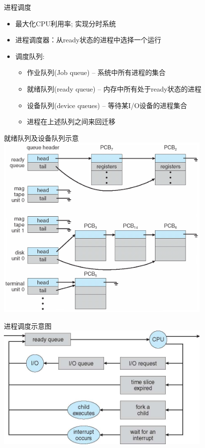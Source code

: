 \documentclass[xcolor=svgnames]{beamer}
\begin{document}
\begin{CJK*}{UTF8}{gbsn}
\begin{frame}{进程调度}
\begin{itemize}
\item 最大化CPU利用率; 实现分时系统
\item 进程调度器：从ready状态的进程中选择一个运行
\item 调度队列:
\begin{itemize}
\item 作业队列(Job queue) -- 系统中所有进程的集合
\item 就绪队列(ready queue) -- 内存中所有处于ready状态的进程
\item 设备队列(device queues) -- 等待某I/O设备的进程集合
\item 进程在上述队列之间来回迁移
\end{itemize}
\end{itemize}
\end{frame}

\begin{frame}{就绪队列及设备队列示意}
\includegraphics[width=0.8\textwidth]{queues.png}
\end{frame}

\begin{frame}{进程调度示意图}
\includegraphics[width=0.8\textwidth]{scheduling.jpg}
\end{frame}



\end{CJK*}
\end{document}
